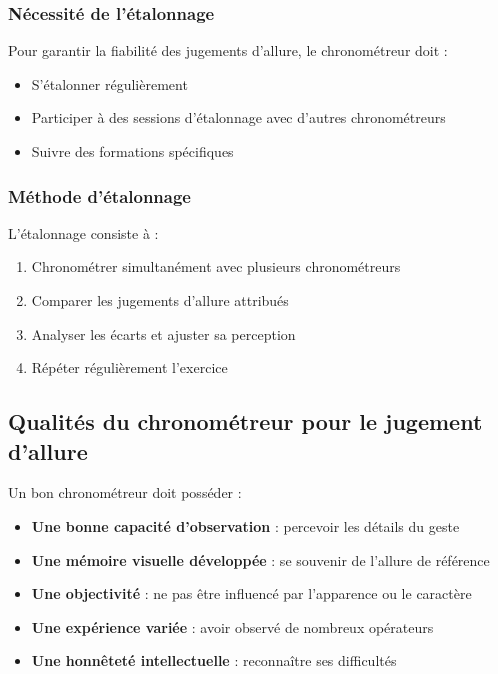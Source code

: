 \documentclass[a4paper,12pt]{article}
\begin{document}
\subsubsection{Nécessité de l'étalonnage}

Pour garantir la fiabilité des jugements d'allure, le chronométreur doit :
\begin{itemize}
    \item S'étalonner régulièrement
    \item Participer à des sessions d'étalonnage avec d'autres chronométreurs
    \item Suivre des formations spécifiques
\end{itemize}

\subsubsection{Méthode d'étalonnage}

L'étalonnage consiste à :
\begin{enumerate}
    \item Chronométrer simultanément avec plusieurs chronométreurs
    \item Comparer les jugements d'allure attribués
    \item Analyser les écarts et ajuster sa perception
    \item Répéter régulièrement l'exercice
\end{enumerate}

\begin{center}
\end{center}

\subsection{Qualités du chronométreur pour le jugement d'allure}

Un bon chronométreur doit posséder :

\begin{itemize}
    \item \textbf{Une bonne capacité d'observation} : percevoir les détails du geste
    \item \textbf{Une mémoire visuelle développée} : se souvenir de l'allure de référence
    \item \textbf{Une objectivité} : ne pas être influencé par l'apparence ou le caractère
    \item \textbf{Une expérience variée} : avoir observé de nombreux opérateurs
    \item \textbf{Une honnêteté intellectuelle} : reconnaître ses difficultés
\end{itemize}
\end{document}
